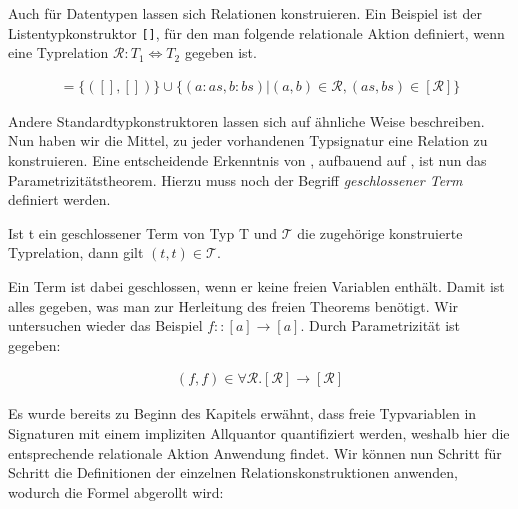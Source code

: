 
Auch für Datentypen lassen sich Relationen konstruieren. Ein Beispiel ist der Listentypkonstruktor \texttt{[]}, für den man folgende
relationale Aktion definiert, wenn eine Typrelation $\mathcal{R} : T_1 \Leftrightarrow T_2$ gegeben ist.

\begin{align*}
[\mathcal{R}] = \{ ([], []) \} \cup \{ (a : as, b : bs) | (a, b) \in \mathcal{R}, (as, bs) \in [\mathcal{R}] \}
\end{align*}

Andere Standardtypkonstruktoren lassen sich auf ähnliche Weise beschreiben. Nun haben wir die Mittel, zu jeder vorhandenen
Typsignatur eine Relation zu konstruieren. Eine entscheidende Erkenntnis von \cite{wadler}, aufbauend auf
\cite{reynolds}, ist nun das Parametrizitätstheorem. Hierzu muss noch der Begriff \textit{geschlossener Term} definiert werden.

\begin{mytheorem}[Parametrizität]
Ist t ein geschlossener Term von Typ T und $\mathcal{T}$ die zugehörige konstruierte Typrelation, dann gilt $(t, t) \in \mathcal{T}$.
\end{mytheorem}

Ein Term ist dabei geschlossen, wenn er keine freien Variablen enthält.
Damit ist alles gegeben, was man zur Herleitung des freien Theorems benötigt. Wir untersuchen wieder das Beispiel
$f :: [a] \rightarrow [a]$. Durch Parametrizität ist gegeben:

\begin{align*}
(f, f) \in \forall \mathcal{R} . [\mathcal{R}] \rightarrow [\mathcal{R}]
\end{align*}

Es wurde bereits zu Beginn des Kapitels erwähnt, dass freie Typvariablen in Signaturen mit einem impliziten Allquantor
quantifiziert werden, weshalb hier die entsprechende relationale Aktion Anwendung findet.
Wir können nun Schritt für Schritt die Definitionen der einzelnen Relationskonstruktionen anwenden, wodurch die Formel
abgerollt wird:

